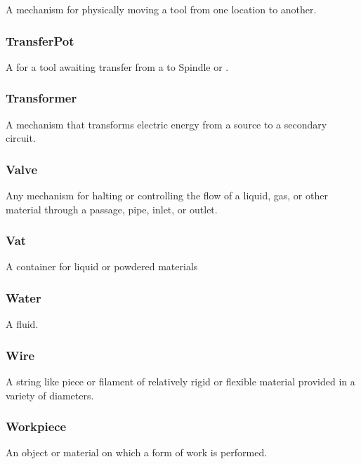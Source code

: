 A mechanism for physically moving a tool from one location to another.


\subsubsection{TransferPot}
\label{sec:TransferPot}



A  for a tool awaiting transfer from a  to \gls{Spindle} or .


\subsubsection{Transformer}
\label{sec:Transformer}



A mechanism that transforms electric energy from a source to a secondary circuit.


\subsubsection{Valve}
\label{sec:Valve}



Any mechanism for halting or controlling the flow of a liquid, gas, or other material through a passage, pipe, inlet, or outlet.


\subsubsection{Vat}
\label{sec:Vat}



A container for liquid or powdered materials


\subsubsection{Water}
\label{sec:Water}



A fluid.


\subsubsection{Wire}
\label{sec:Wire}



A string like piece or filament of relatively rigid or flexible material provided in a variety of diameters.


\subsubsection{Workpiece}
\label{sec:Workpiece}



An object or material on which a form of work is performed.


